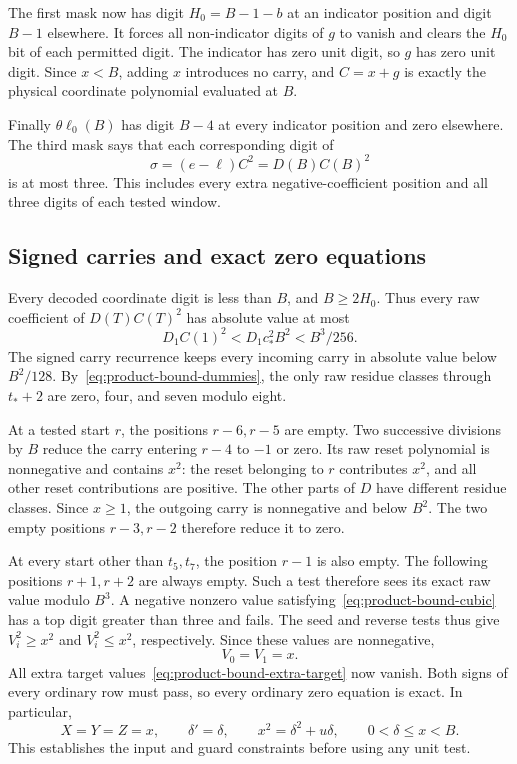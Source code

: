 The first mask now has digit $H_0=B-1-b$ at an indicator position
and digit $B-1$ elsewhere. It forces all non-indicator digits of
$g$ to vanish and clears the $H_0$ bit of each permitted digit.
The indicator has zero unit digit, so $g$ has zero unit digit.
Since $x<B$, adding $x$ introduces no carry, and $C=x+g$ is exactly
the physical coordinate polynomial evaluated at $B$.

Finally $\theta\ell_0(B)$ has digit $B-4$ at every indicator
position and zero elsewhere. The third mask says that each
corresponding digit of
\[
 \sigma=(e-\ell)C^2=D(B)C(B)^2
\]
is at most three. This includes every extra negative-coefficient
position and all three digits of each tested window.

\subsection{Signed carries and exact zero equations}

Every decoded coordinate digit is less than $B$, and $B\ge2H_0$.
Thus every raw coefficient of $D(T)C(T)^2$ has absolute value at most
\begin{equation}\label{eq:product-bound-cubic}
 D_1C(1)^2<D_1c_*^2B^2<B^3/256.
\end{equation}
The signed carry recurrence keeps every incoming carry in absolute
value below $B^2/128$. By~\eqref{eq:product-bound-dummies}, the only
raw residue classes through $t_*+2$ are zero, four, and seven
modulo eight.

At a tested start $r$, the positions $r-6,r-5$ are empty. Two
successive divisions by $B$ reduce the carry entering $r-4$ to
$-1$ or zero. Its raw reset polynomial is nonnegative and contains
$x^2$: the reset belonging to $r$ contributes $x^2$, and all other
reset contributions are positive. The other parts of $D$ have
different residue classes. Since $x\ge1$, the outgoing carry is
nonnegative and below $B^2$. The two empty positions $r-3,r-2$
therefore reduce it to zero.

At every start other than $t_5,t_7$, the position $r-1$ is also
empty. The following positions $r+1,r+2$ are always empty. Such a
test therefore sees its exact raw value modulo $B^3$. A negative
nonzero value satisfying~\eqref{eq:product-bound-cubic} has a top
digit greater than three and fails. The seed and reverse tests
thus give $V_i^2\ge x^2$ and $V_i^2\le x^2$, respectively. Since
these values are nonnegative,
\begin{equation}\label{eq:product-bound-helpers-fixed}
 V_0=V_1=x.
\end{equation}
All extra target values~\eqref{eq:product-bound-extra-target} now
vanish. Both signs of every ordinary row must pass, so every
ordinary zero equation is exact. In particular,
\begin{equation}\label{eq:product-bound-unit-guard}
 X=Y=Z=x,\qquad \delta'=\delta,\qquad
 x^2=\delta^2+u\delta,
 \qquad 0<\delta\le x<B.
\end{equation}
This establishes the input and guard constraints before using any
unit test.


